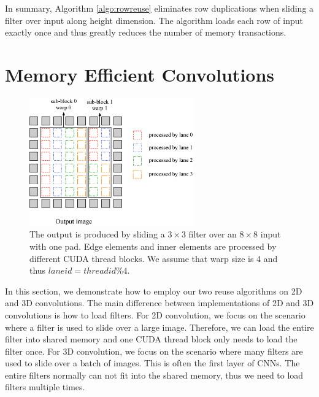 \documentclass[sigplan,review,anonymous]{acmart}\settopmatter{printfolios=true,printccs=false,printacmref=false}
\begin{document}
In summary, Algorithm \ref{algo:rowreuse} eliminates row duplications when sliding a filter over input along height dimension. The algorithm loads each row of input exactly once and thus greatly reduces the number of memory transactions.

\section{Memory Efficient Convolutions}
\begin{figure}
	\centering
	\includegraphics[width=0.9\columnwidth,height=5.5cm]{./figure/overalldesign.eps}
\caption{The output is produced by sliding a $3 \times 3$ filter over an $8 \times 8$ input with one pad. Edge elements and inner elements are processed by different CUDA thread blocks. We assume that warp size is 4 and thus $laneid=threadid\%4$.}
\label{fig:overalldesign}
\end{figure}


In this section, we demonstrate how to employ our two reuse algorithms on 2D and 3D convolutions. The main difference between implementations of 2D and 3D convolutions is how to load filters. For 2D convolution, we focus on the scenario where a filter is used to slide over a large image. Therefore, we can load the entire filter into shared memory and one CUDA thread block only needs to load the filter once. For 3D convolution, we focus on the scenario where many filters are used to slide over a batch of images. This is often the first layer of CNNs. The entire filters normally can not fit into the shared memory, thus we need to load filters multiple times.
\end{document}
